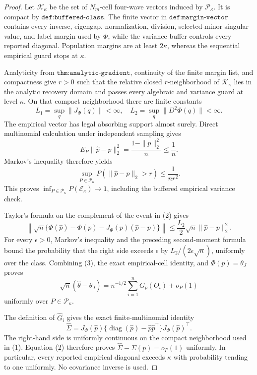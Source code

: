 \documentclass{article}
\begin{document}
\begin{proof}
Let \(\mathcal K_\kappa\) be the set of \(N_m\)-cell four-wave vectors induced by \(\mathcal P_\kappa\).  It is compact by \(\texttt{def:buffered-class}\).  The finite vector in \(\texttt{def:margin-vector}\) contains every inverse, eigengap, normalization, division, selected-minor singular value, and label margin used by \(\Phi\), while the variance buffer controls every reported diagonal.  Population margins are at least \(2\kappa\), whereas the sequential empirical guard stops at \(\kappa\).

Analyticity from \(\texttt{thm:analytic-gradient}\), continuity of the finite margin list, and compactness give \(r>0\) such that the relative closed \(r\)-neighborhood of \(\mathcal K_\kappa\) lies in the analytic recovery domain and passes every algebraic and variance guard at level \(\kappa\).  On that compact neighborhood there are finite constants
\[
 L_1=\sup_q\|J_\Phi(q)\|<\infty,
 \quad
 L_2=\sup_q\|D^2\Phi(q)\|<\infty.
\tag{1}
\]
The empirical vector has legal absorbing support almost surely.  Direct multinomial calculation under independent sampling gives
\[
 E_P\|\widehat p-p\|_2^2
 =\frac{1-\|p\|_2^2}{n}\leq\frac1n.
\]
Markov's inequality therefore yields
\[
 \sup_{P\in\mathcal P_\kappa}
 P(\|\widehat p-p\|_2>r)\leq\frac1{nr^2}.
\tag{2}
\]
This proves \(\inf_{P\in\mathcal P_\kappa}P(\mathcal E_\kappa)\to1\), including the buffered empirical variance check.

Taylor's formula on the complement of the event in (2) gives
\[
 \left\|\sqrt n\{\Phi(\widehat p)-\Phi(p)
 -J_\Phi(p)(\widehat p-p)\}\right\|
 \leq\frac{L_2}{2}\sqrt n\|\widehat p-p\|_2^2.
\tag{3}
\]
For every \(\epsilon>0\), Markov's inequality and the preceding second-moment formula bound the probability that the right side exceeds \(\epsilon\) by \(L_2/(2\epsilon\sqrt n)\), uniformly over the class.  Combining (3), the exact empirical-cell identity, and \(\Phi(p)=\theta_J\) proves
\[
 \sqrt n(\widehat\theta-\theta_J)
 =n^{-1/2}\sum_{i=1}^nG_p(O_i)+o_P(1)
\tag{4}
\]
uniformly over \(P\in\mathcal P_\kappa\).

The definition of \(\widehat G_i\) gives the exact finite-multinomial identity
\[
 \widehat\Sigma=J_\Phi(\widehat p)
 \{\operatorname{diag}(\widehat p)-\widehat p\widehat p^\top\}
 J_\Phi(\widehat p)^\top.
\tag{5}
\]
The right-hand side is uniformly continuous on the compact neighborhood used in (1).  Equation (2) therefore proves \(\widehat\Sigma-\Sigma(p)=o_P(1)\) uniformly.  In particular, every reported empirical diagonal exceeds \(\kappa\) with probability tending to one uniformly.  No covariance inverse is used.


\end{proof}
\end{document}

